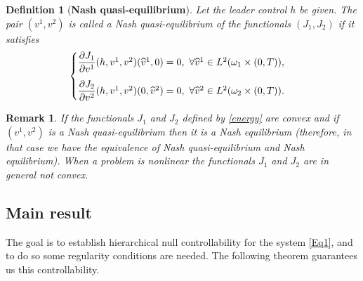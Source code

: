 \documentclass[11pt,a4paper]{amsart}
\numberwithin{equation}{section}
\newtheorem{definition}{Definition}[section]
\newtheorem{remark}{Remark}[section]
\begin{document}
\begin{definition}[\textbf{Nash quasi-equilibrium}]
Let the leader control $h$ be given. The pair $(v^1, v^2)$ is called a Nash quasi-equilibrium of the functionals $(J_1, J_2)$ if it satisfies
\begin{equation}
 \begin{cases} \label{equili}
     \dfrac{\partial J_1}{\partial v^1}(h, v^1, v^2)( \widehat{v}^1, 0) = 0, \text{ }\forall\widehat{v}^1 \in L^2(\omega_1\times (0,T)), \vspace{0.3cm} \\
     \dfrac{\partial J_2}{\partial v^2}(h, v^1, v^2)(0,\widehat{v}^2)= 0, \text{ }\forall\widehat{v}^2 \in L^2(\omega_2\times (0,T)).     
 \end{cases}
\end{equation}     
\end{definition}

\begin{remark}
If the functionals $J_1$ and $J_2$ defined by \eqref{energy} are convex
and if $(v^1, v^2)$ is a Nash quasi-equilibrium then it is a Nash equilibrium (therefore, in that case we have the equivalence of Nash quasi-equilibrium and Nash equilibrium). When a problem is nonlinear the functionals $J_1$ and $J_2$ are in general not convex.
\end{remark}

\subsection{Main result}
 The goal is to establish hierarchical null controllability for the system \eqref{Eq1}, and to do so some regularity conditions are needed. The following theorem guarantees us this controllability.
 
\end{document}
